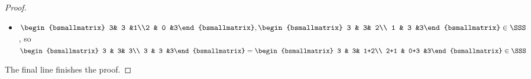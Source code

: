 \documentclass[10pt,a4paper]{article}
\theoremstyle{definition}
\theoremstyle{remark}
\begin{document}
\begin{proof}
\begin{itemize}
\item $\begin{bsmallmatrix} 3& 3 &1\\2 & 0 &3\end{bsmallmatrix}, \begin{bsmallmatrix} 3 & 3& 2\\ 1 & 3 &3\end{bsmallmatrix}\in \SSS$, so
$\begin{bsmallmatrix} 3 & 3& 3\\ 3 & 3 &3\end{bsmallmatrix}=\begin{bsmallmatrix} 3 & 3& 1+2\\ 2+1 & 0+3 &3\end{bsmallmatrix}\in \SSS$
\end{itemize}
The final line finishes the proof.
\end{proof}
\end{document}
